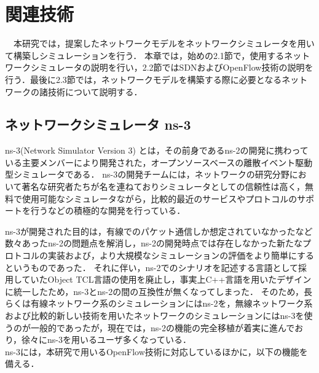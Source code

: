 \chapter{関連技術}

　本研究では，提案したネットワークモデルをネットワークシミュレータを用いて構築しシミュレーションを行う．
本章では，始めの2.1節で，使用するネットワークシミュレータの説明を行い，2.2節ではSDNおよびOpenFlow技術の説明を行う．最後に2.3節では，ネットワークモデルを構築する際に必要となるネットワークの諸技術について説明する．

\section{ネットワークシミュレータ ns-3}

ns-3(Network Simulator Version 3)\cite{ns3} \cite{ns3text} とは，その前身であるns-2の開発に携わっている主要メンバーにより開発された，オープンソースベースの離散イベント駆動型シミュレータである．
ns-3の開発チームには，ネットワークの研究分野において著名な研究者たちが名を連ねておりシミュレータとしての信頼性は高く，無料で使用可能なシミュレータながら，比較的最近のサービスやプロトコルのサポートを行うなどの積極的な開発を行っている．

ns-3が開発された目的は，有線でのパケット通信しか想定されていなかったなど数々あったns-2の問題点を解消し，ns-2の開発時点では存在しなかった新たなプロトコルの実装および，より大規模なシミュレーションの評価をより簡単にするというものであった．
それに伴い，ns-2でのシナリオを記述する言語として採用していたObject TCL言語の使用を廃止し，事実上C++言語を用いたデザインに統一したため，ns-3とns-2の間の互換性が無くなってしまった．
そのため，長らくは有線ネットワーク系のシミュレーションにはns-2を，無線ネットワーク系および比較的新しい技術を用いたネットワークのシミュレーションにはns-3を使うのが一般的であったが，現在では，ns-2の機能の完全移植が着実に進んでおり，徐々にns-3を用いるユーザ多くなっている． \\

ns-3には，本研究で用いるOpenFlow技術に対応しているほかに，以下の機能を備える．

